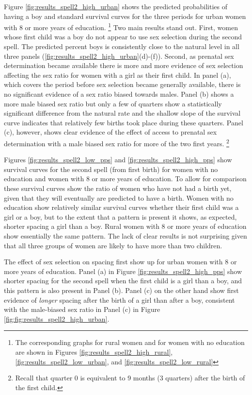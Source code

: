 \documentclass[12pt,letterpaper]{article}
\begin{document}
Figure \ref{fig:results_spell2_high_urban} 
shows the predicted probabilities of having a boy and standard survival curves
for the three periods for urban women with 8 or more years of education.%
\footnote{
The corresponding graphs for rural women and for women with no education are
shown in Figures \ref{fig:results_spell2_high_rural}, \ref{fig:results_spell2_low_urban},
and \ref{fig:results_spell2_low_rural}
}
Two main results stand out.
First, women whose first child was a boy do not appear to use sex selection during
the second spell.
The predicted percent boys is consistently close to the natural level in all three
panels (\ref{fig:results_spell2_high_urban}(d)-(f)).
Second, as prenatal sex determination became available there is more and more
evidence of sex selection affecting the sex ratio for women with a girl as their
first child.
In panel (a), which covers the period before sex selection became generally
available, there is no significant evidence of a sex ratio biased towards males.
Panel (b) shows a more male biased sex ratio but only a few of quarters show
a statistically significant difference from the natural rate and the shallow 
slope of the survival curve indicates that relatively few births took place
during these quarters.
Panel (c), however, shows clear evidence of the effect of access to prenatal
sex determination with a male biased sex ratio for more of the two first years.%
\footnote{
Recall that quarter 0 is equivalent to 9 months (3 quarters) after the birth
of the first child.
}




Figures \ref{fig:results_spell2_low_pps} and \ref{fig:results_spell2_high_pps}
show survival curves for the second spell (from first birth) for women with
no education and women with 8 or more years of education.
To allow for comparison these survival curves show the ratio of women who
have not had a birth yet, given that they will eventually are predicted to
have a birth.
Women with no education show relatively similar survival curves whether their
first child was a girl or a boy, but to the extent that a pattern is present
it shows, as expected, shorter spacing a girl than a boy.
Rural women with 8 or more years of education show essentially the same 
pattern.
The lack of clear results is not surprising given that all three groups of
women are likely to have more than two children.

The effect of sex selection on spacing first show up for urban women with
8 or more years of education.
Panel (a) in Figure \ref{fig:results_spell2_high_pps} show shorter spacing
for the second spell when the first child is a girl than a boy, and this
pattern is also present in Panel (b).
Panel (c) on the other hand show first evidence of \emph{longer} spacing 
after the birth of a girl than after a boy, consistent with the male-biased
sex ratio in Panel (c) in Figure \ref{fig:fig:results_spell2_high_urban}.
\end{document}
